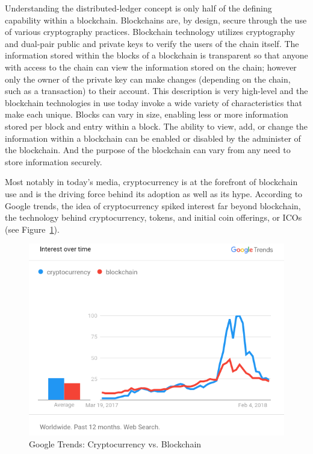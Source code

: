 Understanding the distributed-ledger concept is only half of the defining
capability within a blockchain. Blockchains are, by design, secure through the
use of various cryptography practices. Blockchain technology utilizes
cryptography and dual-pair public and private keys to verify the users of the
chain itself. The information stored within the blocks of a blockchain is
transparent so that anyone with access to the chain can view the information
stored on the chain; however only the owner of the private key can make changes
(depending on the chain, such as a transaction) to their account. This
description is very high-level and the blockchain technologies in use today
invoke a wide variety of characteristics that make each unique. Blocks can vary
in size, enabling less or more information stored per block and entry within a
block. The ability to view, add, or change the information within a blockchain
can be enabled or disabled by the administer of the blockchain. And the purpose
of the blockchain can vary from any need to store information securely.

Most notably in today's media, cryptocurrency is at the forefront of blockchain
use and is the driving force behind its adoption as well as its hype. According
to Google trends, the idea of cryptocurrency spiked interest far beyond
blockchain, the technology behind cryptocurrency, tokens, and initial coin
offerings, or ICOs (see Figure~\ref{f:googletrendchart}). 

\begin{figure}[!ht]
  \centering\includegraphics[width=\columnwidth]
{../images/trendscryptoblockchain.png}
  \caption{Google Trends: Cryptocurrency vs.
Blockchain~\cite{GoogleTrendsCrypto-Blockchain}}
\label{f:googletrendchart}
\end{figure}

